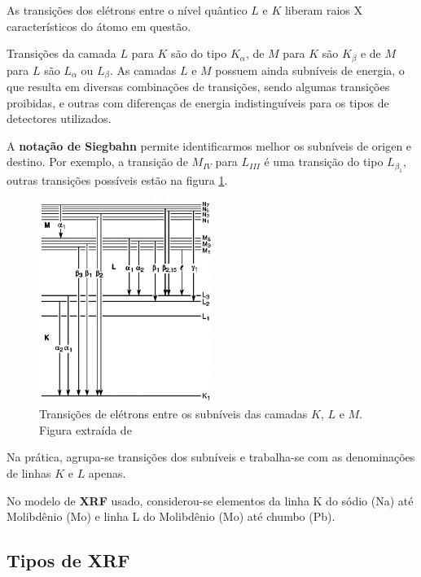As transições dos elétrons entre o nível quântico $L$ e
$K$ liberam raios X característicos do átomo em questão. 

Transições da camada $L$ para $K$ são do tipo $K_{\alpha}$, de $M$ para $K$ 
são $K_{\beta}$ e de $M$ para $L$ são $L_{\alpha}$ ou $L_{\beta}$. 
As camadas $L$ e $M$ possuem ainda subníveis de energia, o que resulta em diversas
combinações de transições, sendo algumas transições proibidas, e outras 
com diferenças de energia indistinguíveis para os tipos de 
detectores utilizados.

A \textbf{notação de Siegbahn} \citep{jenkins1991} permite identificarmos 
melhor os subníveis de origen e destino. 
Por exemplo, a transição de $M_{IV}$ para $L_{III}$ é uma transição do 
tipo $L_{\beta_1}$, outras transições possíveis estão na figura \ref{fig:siegbahn}. 

\begin{figure}[H]
\begin{center} 
  \includegraphics[width=0.5\textwidth]{../inputs/images/Siegbahn.jpg}
  \caption{Transições de elétrons entre os subníveis das camadas $K$, $L$ e $M$. 
           Figura extraída de \citep{jenkins1991} \label{fig:siegbahn}}
\end{center}
\end{figure}

Na prática, agrupa-se transições dos subníveis e trabalha-se com 
as denominações de linhas $K$ e $L$ apenas. 

No modelo de \textbf{XRF} usado, considerou-se elementos da 
linha K do sódio (Na) até Molibdênio (Mo) e linha L do 
Molibdênio (Mo) até chumbo (Pb).  
 
\subsection{Tipos de \textbf{XRF}}

